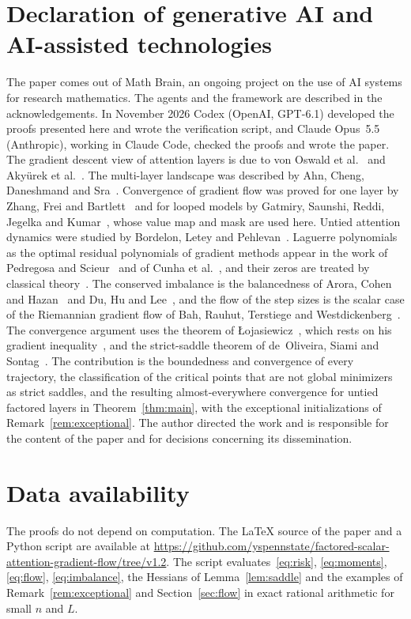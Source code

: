 \documentclass[11pt]{amsart}
\theoremstyle{remark}
\numberwithin{equation}{section}
\begin{document}
\section*{Declaration of generative AI and AI-assisted technologies}
The paper comes out of Math Brain, an ongoing project on the use of AI systems for research mathematics. The agents and the framework are described in the acknowledgements. In November 2026 Codex (OpenAI, GPT-6.1) developed the proofs presented here and wrote the verification script, and Claude Opus~5.5 (Anthropic), working in Claude Code, checked the proofs and wrote the paper. The gradient descent view of attention layers is due to von Oswald et al.~\cite{vonOswald} and Aky\"urek et al.~\cite{Akyurek}. The multi-layer landscape was described by Ahn, Cheng, Daneshmand and Sra~\cite{Ahn}. Convergence of gradient flow was proved for one layer by Zhang, Frei and Bartlett~\cite{ZFB} and for looped models by Gatmiry, Saunshi, Reddi, Jegelka and Kumar~\cite{Gatmiry}, whose value map and mask are used here. Untied attention dynamics were studied by Bordelon, Letey and Pehlevan~\cite{BLP}. Laguerre polynomials as the optimal residual polynomials of gradient methods appear in the work of Pedregosa and Scieur~\cite{PS} and of Cunha et al.~\cite{CGPSP}, and their zeros are treated by classical theory~\cite{Szego}. The conserved imbalance is the balancedness of Arora, Cohen and Hazan~\cite{ACH} and Du, Hu and Lee~\cite{DHL}, and the flow of the step sizes is the scalar case of the Riemannian gradient flow of Bah, Rauhut, Terstiege and Westdickenberg~\cite{BRTW}. The convergence argument uses the theorem of \L{}ojasiewicz~\cite{Loj84}, which rests on his gradient inequality~\cite{Loj63}, and the strict-saddle theorem of de~Oliveira, Siami and Sontag~\cite{OSS}. The contribution is the boundedness and convergence of every trajectory, the classification of the critical points that are not global minimizers as strict saddles, and the resulting almost-everywhere convergence for untied factored layers in Theorem~\ref{thm:main}, with the exceptional initializations of Remark~\ref{rem:exceptional}. The author directed the work and is responsible for the content of the paper and for decisions concerning its dissemination.

\section*{Data availability}
The proofs do not depend on computation. The \LaTeX{} source of the paper and a Python script are available at \url{https://github.com/yspennstate/factored-scalar-attention-gradient-flow/tree/v1.2}. The script evaluates~\eqref{eq:risk}, \eqref{eq:moments}, \eqref{eq:flow}, \eqref{eq:imbalance}, the Hessians of Lemma~\ref{lem:saddle} and the examples of Remark~\ref{rem:exceptional} and Section~\ref{sec:flow} in exact rational arithmetic for small $n$ and $L$.
\end{document}
